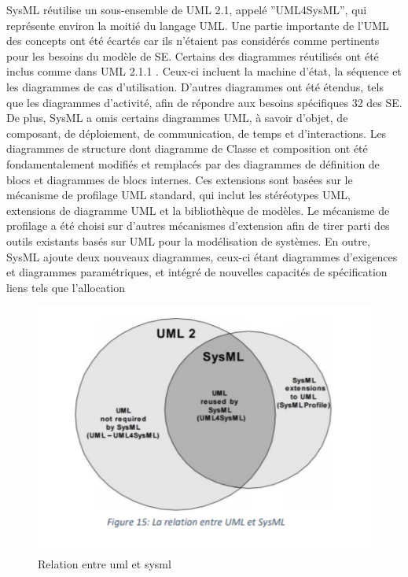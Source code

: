 \documentclass[12pt,a4paper]{report}
\begin{document}
\noindent \begin{flushleft}
	
	
	\noindent SysML r\'{e}utilise un sous-ensemble de UML 2.1, appel\'{e} ''UML4SysML'', qui repr\'{e}sente environ la moiti\'{e} du langage UML. Une partie importante de l'UML des concepts ont \'{e}t\'{e} \'{e}cart\'{e}s car ils n'\'{e}taient pas consid\'{e}r\'{e}s comme pertinents pour les besoins du mod\`{e}le de SE. Certains des diagrammes r\'{e}utilis\'{e}s ont \'{e}t\'{e} inclus comme dans UML 2.1.1 . Ceux-ci incluent la machine d'\'{e}tat, la s\'{e}quence et les diagrammes de cas d'utilisation. D'autres diagrammes ont \'{e}t\'{e} \'{e}tendus, tels que les diagrammes d'activit\'{e}, afin de r\'{e}pondre aux besoins sp\'{e}cifiques 32 des SE. De plus, SysML a omis certains diagrammes UML, \`{a} savoir d'objet, de composant, de d\'{e}ploiement, de communication, de temps et d'interactions. Les diagrammes de structure dont diagramme de Classe et composition ont \'{e}t\'{e} fondamentalement modifi\'{e}s et remplac\'{e}s par des diagrammes de d\'{e}finition de blocs et diagrammes de blocs internes. Ces extensions sont bas\'{e}es sur le m\'{e}canisme de profilage UML standard, qui inclut les st\'{e}r\'{e}otypes UML, extensions de diagramme UML et la biblioth\`{e}que de mod\`{e}les. Le m\'{e}canisme de profilage a \'{e}t\'{e} choisi sur d'autres m\'{e}canismes d'extension afin de tirer parti des outils existants bas\'{e}s sur UML pour la mod\'{e}lisation de syst\`{e}mes. En outre, SysML ajoute deux nouveaux diagrammes, ceux-ci \'{e}tant diagrammes d'exigences et diagrammes param\'{e}triques, et int\'{e}gr\'{e} de nouvelles capacit\'{e}s de sp\'{e}cification liens tels que l'allocation
	
	\noindent 
	
	\noindent 
\end{flushleft}


\begin{figure}[H]
	\centering
	\includegraphics[width=0.8\linewidth]{image26.png}
	\caption{Relation entre uml et sysml}
	
\end{figure}
\end{document}
